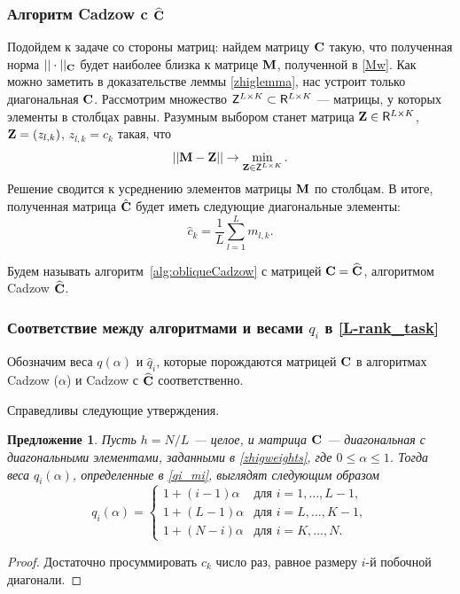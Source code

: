 \documentclass[12pt,a4paper,fleqn,leqno]{article}
\newtheorem{proposition}{Предложение}%
\begin{document}
\subsubsection{Алгоритм Cadzow c $\widehat{\mathbf{C}}$}
\label{sec:cadzow_hat}
Подойдем к задаче со стороны матриц: найдем матрицу $\mathbf{C}$ такую, что полученная норма $||\cdot||_{\mathbf{C}}$ будет наиболее близка к матрице $\mathbf{M}$, полученной в \eqref{Mw}. Как можно заметить в доказательстве леммы \ref{zhiglemma}, нас устроит только диагональная $\mathbf{C}$. Рассмотрим множество $\mathsf{Z}^{L \times K} \subset \mathsf{R}^{L \times K}$ --- матрицы, у которых элементы в столбцах равны. Разумным выбором станет матрица $\mathbf{Z} \in \mathsf{R}^{L \times K}$, $\mathbf{Z}=(z_{l,k})$, $z_{l,k} = c_k$ такая, что
\begin{equation*}
||\mathbf{M} - \mathbf{Z}|| \to \min_{\mathbf{Z} \in \mathsf{Z}^{L \times K}}.
\end{equation*}
Решение сводится к усреднению элементов матрицы $\mathbf{M}$ по столбцам. В итоге, полученная матрица $\hat {\mathbf{C}}$ будет иметь следующие диагональные элементы:
\begin{equation}\label{my_s}
\hat c_k = \frac{1}{L}\sum_{l=1}^L m_{l, k}.
\end{equation}

Будем называть алгоритм~\ref{alg:obliqueCadzow} с матрицей $\mathbf{C}=\widehat{\mathbf{C}}$, алгоритмом Cadzow $\widehat{\mathbf{C}}$.

\subsubsection{Соответствие между алгоритмами и весами $q_i$ в \eqref{L-rank_task}}

Обозначим веса $q(\alpha)$ и $\hat q_i$, которые порождаются матрицей $\mathbf{C}$ в алгоритмах Cadzow ($\alpha$) и Cadzow с $\widehat{\mathbf{C}}$ соответственно.

Справедливы следующие утверждения.

\begin{proposition}\label{zhigconseq}
Пусть $h = N/L$ --- целое, и матрица $\mathbf{C}$ --- диагональная с диагональными элементами,
заданными в \eqref{zhigweights},
где $0 \le \alpha \le 1$. Тогда веса $q_i(\alpha)$, определенные в \eqref{qi_mi}, выглядят следующим образом
\begin{equation*}
q_i (\alpha) = \begin{cases}
1 + (i - 1) \alpha & \text{для $i = 1, \ldots, L-1,$}\\
1 + (L - 1) \alpha & \text{для $i = L, \ldots, K-1,$}\\
1 + (N - i) \alpha & \text{для $i = K, \ldots, N.$}
\end{cases}
\end{equation*}
\end{proposition}
\begin{proof}
Достаточно просуммировать $c_k$ число раз, равное размеру $i$-й побочной диагонали.
\end{proof}
\end{document}

